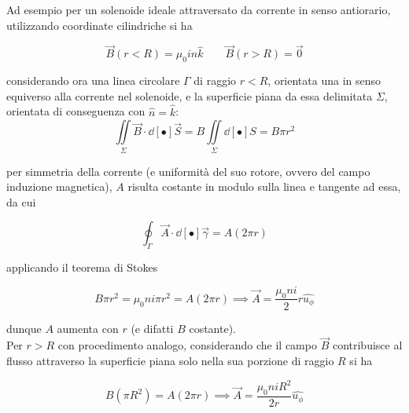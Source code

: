 Ad esempio per un solenoide ideale attraversato da corrente in senso antiorario, utilizzando coordinate cilindriche si ha

\[\vec{B}(r < R) = \mu_0 i n \hat{k} \qquad \vec{B}(r > R) = \vec{0}\]

considerando ora una linea circolare $\Gamma$ di raggio $r < R$, orientata una in senso equiverso alla corrente nel solenoide, e la superficie piana da essa delimitata $\Sigma$, orientata di conseguenza con $\hat{n} = \hat{k}$:
\[\iint\limits_{\Sigma} \vec{B} \cdot \dd[•]{\vec{S}} = B \iint\limits_{\Sigma} \dd[•]{S} = B \pi r^2\]

per simmetria della corrente (e uniformità del suo rotore, ovvero del campo induzione magnetica), $A$ risulta costante in modulo sulla linea e tangente ad essa, da cui

\[\oint_\Gamma \vec{A} \cdot \dd[•]{\vec{\gamma}} = A (2 \pi r)\]

applicando il teorema di Stokes

\[B \pi r^2 = \mu_0 n i \pi r^2 = A (2 \pi r) \implies \vec{A} = \frac{\mu_0 n i}{2} r \hat{u_\phi}\]

dunque $A$ aumenta con $r$ (e difatti $B$ costante).
\\Per $r > R$ con procedimento analogo, considerando che il campo $\vec{B}$ contribuisce al flusso attraverso la superficie piana solo nella sua porzione di raggio $R$ si ha

\[B (\pi R^2) = A (2 \pi r) \implies \vec{A} = \frac{\mu_0 n i R^2}{2 r} \hat{u_\phi}\]


